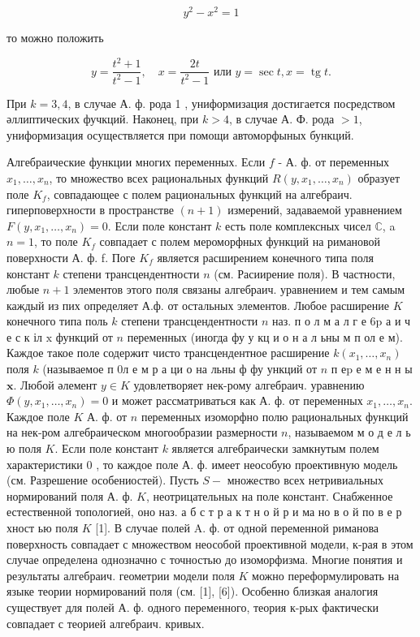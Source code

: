 \documentclass[10pt]{article}
\begin{document}
\[

y^{2}-x^{2}=1

\]



то можно положить



\[

y=\frac{t^{2}+1}{t^{2}-1}, \quad x=\frac{2 t}{t^{2}-1} \text { или } y=\sec t, x=\operatorname{tg} t .

\]



При $k=3,4$, в случае А. ф. рода 1 , униформизация достигается посредством әллиптических фучкций. Наконец, при $k>4$, в случае А. Ф. рода $>1$, униформизация осуществляется при помощи автоморфыных бункций.



Алгебраические функции многих переменных. Если $f$ - А. ф. от переменных $x_{1}, \ldots, x_{n}$, то множество всех рациональных функций $R\left(y, x_{1}, \ldots, x_{n}\right)$ образует поле $K_{f}$, совпадающее с полем рациональных функций на алгебраич. гиперповерхности в пространстве $(n+1)$ измерений, задаваемой уравнением $F\left(y, x_{1}, \ldots, x_{n}\right)=0$. Если поле констант $k$ есть поле комплексных чисел $\mathbb{C}$, a $n=1$, то поле $K_{f}$ совпадает с полем мероморфных функций на римановой поверхности А. ф. f. Поге $K_{f}$ является расширением конечного типа поля констант $k$ степени трансцендентности $n$ (см. Расиирение поля). В частности, любые $n+1$ элементов этого поля связаны алгебраич. уравнением и тем самым каждый из пих определяет А.ф. от остальных элементов. Любое расширение $K$ конечного типа поль $k$ степени трансцендентности $n$ наз. п о л м а л г е $6 \mathrm{p}$ а и ч е с к іл $\mathrm{x}$ функций от $n$ переменных (иногда фу у кц и о н а л ьны м п ол е м). Каждое такое поле содержит чисто трансцендентное расширение $k\left(x_{1}, \ldots, x_{n}\right)$ поля $k$ (называемое п 0л е м р а ци о на льны ф фу ункций от $n$ п е$\mathrm{p}$ е м е н н ы $\mathbf{x}$. Любой әлемент $y \in K$ удовлетворяет нек-рому алгебраич. уравнению $\Phi\left(y, x_{1}, \ldots, x_{n}\right)=0$ и может рассматриваться как А. ф. от переменных $x_{1}, \ldots, x_{n}$. Каждое поле $K$ А. ф. от $n$ переменных изоморфно полю рациональных функций на нек-ром алгебраическом многообразии размерности $n$, называемом м о д е л ь ю поля $K$. Если поле констант $k$ является алгебраически замкнутым полем характеристики 0 , то каждое поле А. ф. имеет неособую проективную модель (см. Разрешение особениостей). Пусть $S-$ множество всех нетривиальных нормирований поля А. ф. $K$, неотрицательных на поле констант. Снабженное естественной топологией, оно наз. а б с т р а к т н о й р и ма но в о й по в е р хност ью поля $K$ [1]. В случае полей $\mathrm{A}$. ф. от одной переменной риманова поверхность совпадает с множеством неособой проективной модели, к-рая в этом случае определена однозначно с точностью до изоморфизма. Многие понятия и результаты алгебраич. геометрии модели поля $K$ можно переформулировать на языке теории нормирований поля (см. [1], [6]). Особенно близкая аналогия существует для полей А. ф. одного переменного, теория к-рых фактически совпадает с теорией алгебраич. кривых.
\end{document}

